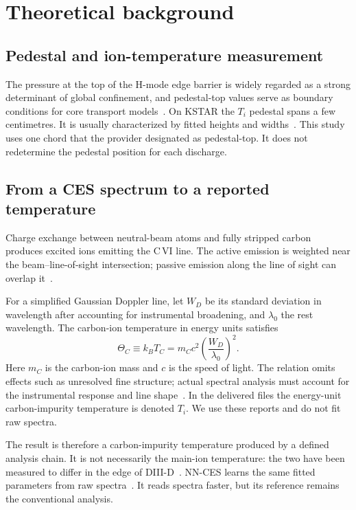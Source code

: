 \section{Theoretical background}
\label{sec:background}

\subsection{Pedestal and ion-temperature measurement}
The pressure at the top of the H-mode edge barrier is widely regarded as a strong determinant of global confinement, and pedestal-top values serve as boundary conditions for core transport models~\citep{Snyder2011FirstPrinciples}. On KSTAR the $T_i$ pedestal spans a few centimetres. It is usually characterized by fitted heights and widths~\citep{Ko2015IonTemperature}. This study uses one chord that the provider designated as pedestal-top. It does not redetermine the pedestal position for each discharge.

\subsection{From a CES spectrum to a reported temperature}
Charge exchange between neutral-beam atoms and fully stripped carbon produces excited ions emitting the C\,VI line. The active emission is weighted near the beam--line-of-sight intersection; passive emission along the line of sight can overlap it~\citep{Fonck1984DeterminationPlasma,Isler1994OverviewCharge,Viezzer2011PassiveEdge}.

For a simplified Gaussian Doppler line, let $W_D$ be its standard deviation in wavelength after accounting for instrumental broadening, and $\lambda_0$ the rest wavelength. The carbon-ion temperature in energy units satisfies
\begin{equation}
 \Theta_C \equiv k_B T_C = m_C c^2\left(\frac{W_D}{\lambda_0}\right)^2 .
\end{equation}
Here $m_C$ is the carbon-ion mass and $c$ is the speed of light. The relation omits effects such as unresolved fine structure; actual spectral analysis must account for the instrumental response and line shape~\citep{Fonck1984DeterminationPlasma,Lee2026NeuralNetworkbased}. In the delivered files the energy-unit carbon-impurity temperature is denoted $T_i$. We use these reports and do not fit raw spectra.

The result is therefore a carbon-impurity temperature produced by a defined analysis chain. It is not necessarily the main-ion temperature: the two have been measured to differ in the edge of DIII-D~\citep{Haskey2018MainIon}. NN-CES learns the same fitted parameters from raw spectra~\citep{Lee2026NeuralNetworkbased}. It reads spectra faster, but its reference remains the conventional analysis.

